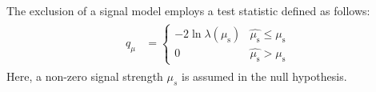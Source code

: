 			The exclusion of a signal model employs a test statistic defined as follows:
			\begin{align}
			\label{eq:test_exclusion}
				\begin{split}
					q_{\mu} & = 
					\begin{cases}
						-2 \ln \lambda \left( \mu_{\mathrm{s}} \right ) & \hat{\mu_{\mathrm{s}}} \leq \mu_{\mathrm{s}} \\
						0   & \hat{\mu_{\mathrm{s}}} > \mu_{\mathrm{s}}
					\end{cases}
				\end{split}
			\end{align}
			\noindent Here, a non-zero signal strength $\mu_s$ is assumed in the null hypothesis.



